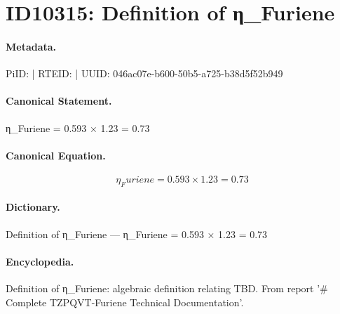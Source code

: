 \section*{ID10315: Definition of η\_Furiene}
\paragraph{Metadata.}
PiID:  | RTEID:  | UUID: 046ac07e-b600-50b5-a725-b38d5f52b949

\paragraph{Canonical Statement.}
η\_Furiene = 0.593 × 1.23 = 0.73

\paragraph{Canonical Equation.}
\[
η_Furiene = 0.593 × 1.23 = 0.73
\]

\paragraph{Dictionary.}
Definition of η\_Furiene — η\_Furiene = 0.593 × 1.23 = 0.73

\paragraph{Encyclopedia.}
Definition of η\_Furiene: algebraic definition relating TBD. From report '\# Complete TZPQVT-Furiene Technical Documentation'.
